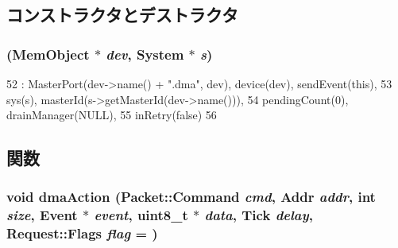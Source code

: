 \subsection{コンストラクタとデストラクタ}
\hypertarget{classDmaPort_a7e3134f5a5a31bf28df04f0d6223ac3b}{
\subsubsection[{DmaPort}]{ ({\bf MemObject} $\ast$ {\em dev}, \/  {\bf System} $\ast$ {\em s})}}
\label{classDmaPort_a7e3134f5a5a31bf28df04f0d6223ac3b}



\begin{DoxyCode}
52     : MasterPort(dev->name() + ".dma", dev), device(dev), sendEvent(this),
53       sys(s), masterId(s->getMasterId(dev->name())),
54       pendingCount(0), drainManager(NULL),
55       inRetry(false)
56 { }
\end{DoxyCode}


\subsection{関数}
\hypertarget{classDmaPort_ac9a04fe85b8cb0292631680073eddb86}{
\subsubsection[{dmaAction}]{\setlength{\rightskip}{0pt plus 5cm}void dmaAction ({\bf Packet::Command} {\em cmd}, \/  {\bf Addr} {\em addr}, \/  int {\em size}, \/  {\bf Event} $\ast$ {\em event}, \/  uint8\_\-t $\ast$ {\em data}, \/  {\bf Tick} {\em delay}, \/  {\bf Request::Flags} {\em flag} = {})}}
\label{classDmaPort_ac9a04fe85b8cb0292631680073eddb86}



